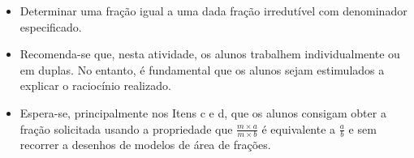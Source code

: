 \begin{multicols}{2}
\begin{solucao}{}{}
\begin{enumerate}[a)]
\begin{center}

\end{center}
\end{enumerate}
\end{solucao}
\Bg

\begin{objetivos}[label=chap4-ativ9]{}{}
\begin{itemize} %
    \item       Determinar uma fração igual a uma dada fração irredutível com
denominador especificado.
\end{itemize} %
\end{objetivos}

  
\begin{orientacoes}{}{}

\begin{itemize} %
    \item       Recomenda-se que, nesta atividade, os alunos trabalhem
individualmente ou em duplas. No entanto, é fundamental que os alunos sejam
estimulados a explicar o raciocínio realizado.
    \item       Espera-se, principalmente nos Itens c e d, que os alunos
consigam obter a fração solicitada usando a propriedade que       $\frac{m
\times a}{m \times b}$       é equivalente a       $\frac{a}{b}$       e sem
recorrer a desenhos de modelos de área de frações.
\end{itemize} %





\end{orientacoes}
\end{multicols}
